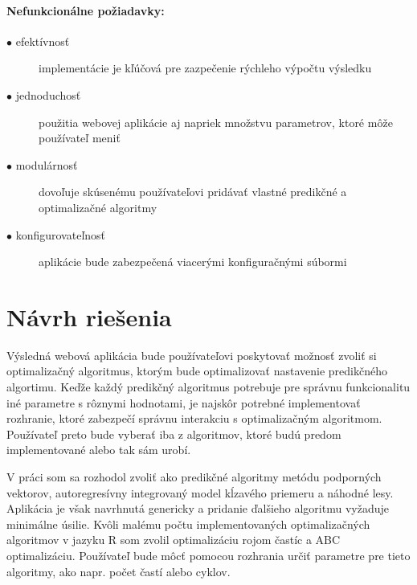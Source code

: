 \documentclass[a4paper,slovak,12pt,appendix]{article}
\begin{document}
\noindent
\paragraph{Nefunkcionálne požiadavky:}
\begin{description}
  \item[$\bullet$ efektívnosť] implementácie je kľúčová pre zazpečenie rýchleho výpočtu výsledku
  \item[$\bullet$ jednoduchosť] použitia webovej aplikácie aj napriek množstvu parametrov, ktoré môže používateľ meniť
  \item[$\bullet$ modulárnosť] dovoľuje skúsenému používateľovi pridávať vlastné predikčné a optimalizačné algoritmy
  \item[$\bullet$ konfigurovateľnosť] aplikácie bude zabezpečená viacerými konfiguračnými súbormi
\end{description}


\newpage
\section{Návrh riešenia}
\label{solution-design}
Výsledná webová aplikácia bude používateľovi poskytovať možnosť zvoliť si
optimalizačný algoritmus, ktorým bude optimalizovať nastavenie predikčného
algortimu. Keďže každý predikčný algoritmus potrebuje pre správnu funkcionalitu
iné parametre s rôznymi hodnotami, je najskôr potrebné implementovať rozhranie,
ktoré zabezpečí správnu interakciu s optimalizačným algoritmom. Používateľ
preto bude vyberať iba z algoritmov, ktoré budú predom implementované alebo tak
sám urobí.

V práci som sa rozhodol zvoliť ako predikčné algoritmy metódu podporných
vektorov, autoregresívny integrovaný model kĺzavého priemeru a náhodné lesy.
Aplikácia je však navrhnutá genericky a pridanie ďalšieho algoritmu vyžaduje
minimálne úsilie. Kvôli malému počtu implementovaných optimalizačných
algoritmov v jazyku R som zvolil optimalizáciu rojom častíc a ABC
optimalizáciu. Používateľ bude môcť pomocou rozhrania určiť parametre pre tieto
algoritmy, ako napr. počet častí alebo cyklov.

\end{document}
